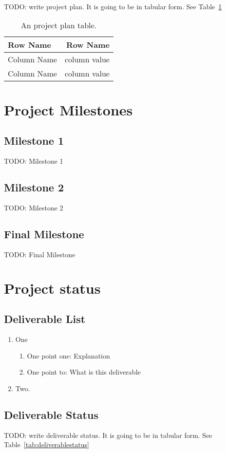 \documentclass[a4paper]{article}
\begin{document}
TODO: write project plan. It is going to be in tabular form. See Table~\ref{tab:projectplan}

\begin{table}
\centering
\begin{tabular}{l|r}
Row Name & Row Name \\\hline
Column Name & column value \\
Column Name & column value
\end{tabular}
\caption{\label{tab:projectplan}An project plan table.}
\end{table}

\section{Project Milestones}
\subsection{Milestone 1}
TODO: Milestone 1
\subsection{Milestone 2}
TODO: Milestone 2
\subsection{Final Milestone}
TODO: Final Milestone

\section{Project status}
\subsection{Deliverable List}

\begin{enumerate}
\item One
  \begin{enumerate}
  \item One point one: Explanation
  \item One point to: What is this deliverable
  \end{enumerate}
\item Two.
\end{enumerate}

\subsection{Deliverable Status}
TODO: write deliverable status. It is going to be in tabular form. See Table~\ref{tab:deliverablestatus}
\end{document}
